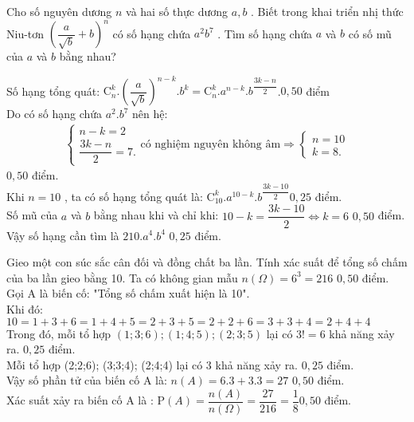 \begin{bt}[2,0 điểm]%
	Cho số nguyên dương $n$ và hai số thực dương $a,b$ . Biết trong khai triển nhị thức Niu-tơn ${{\left( \dfrac{a}{\sqrt{b}}+b \right)}^{n}}$ có số hạng chứa ${{a}^{2}}{{b}^{7}}$ . Tìm số hạng chứa $a$ và $b$ có số mũ của $a$ và $b$ bằng nhau?
	\loigiai
	{Số hạng tổng quát: $\mathrm{C}_n^k.{\left( \dfrac{a}{\sqrt b} \right)}^{n-k}.b^k=\mathrm{C}_n^k.a^{n-k}.{b^{\dfrac{3k-n}{2}}}$.\dotfill $0,50$ điểm\\
		Do có số hạng chứa $a^2.b^7$ nên hệ:
		\begin{align*}
		\begin{cases}
		n-k=2 \\ 
		\dfrac{3k-n}{2}=7.
		\end{cases} \text{có nghiệm nguyên không âm}
		\Rightarrow
		\begin{cases}
		n=10 \\ 
		k=8.
		\end{cases}
		\end{align*} \dotfill $0,50$ điểm.\\
		Khi $n=10$ , ta có số hạng tổng quát là: $\mathrm{C}_{10}^{k}.{{a}^{10-k}}.{{b}^{\dfrac{3k-10}{2}}}$\dotfill $0,25$ điểm.\\
		Số mũ của $a$ và $b$ bằng nhau khi và chỉ khi: $10-k=\dfrac{3k-10}{2}\Leftrightarrow k=6$ \dotfill $0,50$ điểm.\\
		Vậy số hạng cần tìm là $210.{{a}^{4}}.{{b}^{4}}$ \dotfill $0,25$ điểm.
		
	}
\end{bt}
\begin{bt}[2,0 điểm]%
Gieo một con súc sắc cân đối và đồng chất ba lần. Tính xác suất để tổng số chấm của ba lần gieo bằng 10.
	\loigiai
	{	Ta có không gian mẫu $n(\Omega )=6^3=216$ \dotfill $0,50$ điểm.\\
		Gọi A là biến cố: "Tổng số chấm xuất hiện là 10". \\
		Khi đó: $10=1+3+6=1+4+5=2+3+5=2+2+6=3+3+4=2+4+4$\\
		Trong đó, mỗi tổ hợp $(1;3;6); (1;4;5); (2;3;5)$  lại có $3!=6$ khả năng xảy ra. \dotfill $0,25$ điểm.\\
		Mỗi tổ hợp (2;2;6); (3;3;4); (2;4;4)  lại có 3 khả năng xảy ra. \dotfill $0,25$ điểm.\\
		Vậy số phần tử của biến cố A là: $n(A)=6.3+3.3=27$ \dotfill $0,50$ điểm.\\
		Xác suất xảy ra biến cố A là : $\mathrm{P}(A)=\dfrac{n(A)}{n(\Omega )}=\dfrac{27}{216}=\dfrac{1}{8}$\dotfill $0,50$ điểm.\\
	}
\end{bt}
